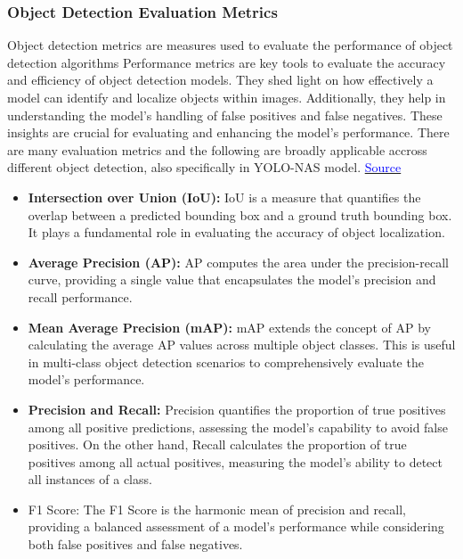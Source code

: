 \subsubsection{Object Detection Evaluation Metrics}
Object detection metrics are measures used to evaluate the performance of object detection algorithms
Performance metrics are key tools to evaluate the accuracy and efficiency of object detection models. They shed light on how effectively a model can identify and localize objects within images. Additionally, they help in understanding the model's handling of false positives and false negatives. These insights are crucial for evaluating and enhancing the model's performance.
There are many evaluation metrics and the following are broadly applicable accross different object detection, also specifically in YOLO-NAS model. \cite{metrics}
\href{https://docs.ultralytics.com/guides/yolo-performance-metrics/#object-detection-metrics}{\textcolor{blue}{Source}}
\begin{itemize}
    \item \textbf{Intersection over Union (IoU):} IoU is a measure that quantifies the overlap between a predicted bounding box and a ground truth bounding box. It plays a fundamental role in evaluating the accuracy of object localization.
    \item \textbf{Average Precision (AP):} AP computes the area under the precision-recall curve, providing a single value that encapsulates the model's precision and recall performance.
    \item \textbf{Mean Average Precision (mAP):} mAP extends the concept of AP by calculating the average AP values across multiple object classes. This is useful in multi-class object detection scenarios to comprehensively evaluate the model's performance.
    \item \textbf{Precision and Recall:} Precision quantifies the proportion of true positives among all positive predictions, assessing the model's capability to avoid false positives. On the other hand, Recall calculates the proportion of true positives among all actual positives, measuring the model's ability to detect all instances of a class.
    \item F1 Score: The F1 Score is the harmonic mean of precision and recall, providing a balanced assessment of a model's performance while considering both false positives and false negatives.
\end{itemize}

